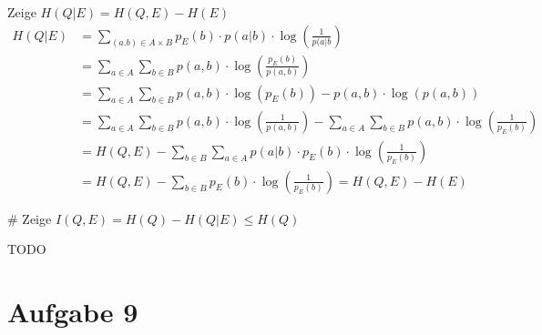 \begin{myList}
Zeige $H(Q|E) = H(Q,E) - H(E)$
\begin{align*}
	H(Q|E) &= \sum\limits_{(a.b) \in A \times B} p_E(b)\cdot p(a|b) \cdot \log \left( \frac{1}{p(a|b}\right) \\
	&=\sum\limits_{a \in A} \sum\limits_{b \in B}  p(a,b) \cdot \log \left( \frac{p_E(b)}{p(a,b)}\right) \\
	&= \sum\limits_{a \in A} \sum\limits_{b \in B} p(a,b) \cdot \log (p_E(b)) - p(a,b) \cdot \log(p(a,b)) \\
	&= \sum\limits_{a \in A} \sum\limits_{b \in B} p(a,b) \cdot \log\left(\frac{1}{p(a,b)}\right) - \sum\limits_{a \in A} \sum\limits_{b \in B}  p(a,b) \cdot \log \left(\frac{1}{p_E(b)}\right) \\
	&= H(Q,E) - \sum\limits_{b \in B} \sum\limits_{a \in A}  p(a|b) \cdot p_E(b) \cdot \log \left(\frac{1}{p_E(b)}\right) \\
	&= H(Q,E) - \sum\limits_{b \in B} p_E(b) \cdot \log \left(\frac{1}{p_E(b)}\right) = H(Q,E) - H(E)
\end{align*}

#
Zeige $I(Q,E) = H(Q) - H(Q|E) \leq H(Q)$

TODO

\end{myList}

\section*{Aufgabe 9}


